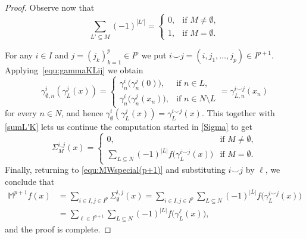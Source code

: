 \documentclass{amsart}
\theoremstyle{plain}%
\theoremstyle{definition}
\theoremstyle{remark}
\begin{document}
\begin{proof}
Observe now that
\begin{equation}\label{sumL'K}
\sum_{L'\subseteq M}(-1)^{|L'|}=
\begin{cases}
0,&\text{if }M\neq\emptyset,\\
1,&\text{if }M=\emptyset. 
\end{cases}
\end{equation}

For any $i\in I$ and $j=(j_k)_{k=1}^p\in I^p$ we put $i\smallsmile j=(i,j_1,\dots,j_p)\in I^{p+1}$.
Applying~\eqref{equ:gammaKLij} we obtain 
\begin{equation*}
\gamma^i_{\emptyset,n}(\gamma^j_L(x))
=\begin{cases}
\gamma^i_n\big(\gamma^j_n(0)\big),&\text{if }n\in L,\\
\gamma^i_n\big(\gamma^j_n(x_n)\big),&\text{if }n\in N\setminus L
\end{cases}
=\gamma^{i\smallsmile j}_{L,n}(x_n)
\end{equation*}
for every $n\in N$, and hence $\gamma^i_{\emptyset}(\gamma^j_L(x))=\gamma^{i\smallsmile j}_{L}(x)$.
This together with \eqref{sumL'K} lets us continue the computation started in \eqref{Sigma} to get
\begin{equation*}
\Sigma^{i,j}_M(x)=
\begin{cases}
0,&\text{if }M\ne\emptyset,\\ 			
\sum_{L\subseteq N}(-1)^{|L|}f\big(\gamma^{i\smallsmile j}_L(x)\big)&\text{if }M=\emptyset.
\end{cases}
\end{equation*}
Finally, returning to \eqref{equ:MWspecial(p+1)} and substituting $i\smallsmile j$ by $\ell$, we conclude that
\begin{align*}
\mathbb{M}^{p+1} f(x)&=\sum_{i\in I,j\in  I^{p}}\Sigma_\emptyset^{i,j}(x)
=\sum_{i\in I, j\in  I^{p}}\sum_{L\subseteq N}(-1)^{|L|}f\big(\gamma^{i\smallsmile j}_L(x)\big)\\
&=\sum_{\ell\in I^{p+1}}\sum_{L\subseteq N}(-1)^{|L|}f\big(\gamma^{\ell}_L(x)\big),
\end{align*}
and the proof is complete.
\end{proof}

\end{document}
